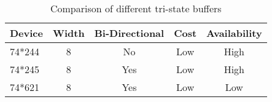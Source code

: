 \begin{table}[bhp]
\caption[Buffer Comparison]{Comparison of different tri-state buffers}
\small
\begin{center}
\begin{tabular}{l| c c c c}
\setlength{\tabcolsep}{1pt}
	Device & Width & Bi-Directional & Cost & Availability \\\hline
	74*244 & 8     & No             & Low  & High\\
	74*245 & 8     & Yes            & Low  & High\\
	74*621 & 8     & Yes            & Low  & Low
\end{tabular}
\end{center}
\label{tab:buffer comparison}
\end{table}
